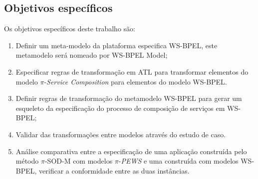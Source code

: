 \subsection{Objetivos específicos}

Os objetivos específicos deste trabalho são:

\begin{enumerate}
\item  Definir um meta-modelo da plataforma especifica WS-BPEL, este metamodelo será nomeado por WS-BPEL Model;

\item  Especificar regras de transformação em ATL para transformar elementos do modelo $\pi$-\textit{Service Composition} para elementos do modelo WS-BPEL.

\item  Definir regras de transformação do metamodelo WS-BPEL para gerar um esqueleto da especificação do processo de composição de serviços em WS-BPEL; 

\item  Validar das transformações entre modelos através do estudo de caso.

\item  Análise comparativa entre a especificação de uma aplicação construída pelo método $\pi$-SOD-M com modelos $\pi$-\textit{PEWS} e uma construída com modelos WS-BPEL, verificar a conformidade entre as duas instâncias.
\end{enumerate}


